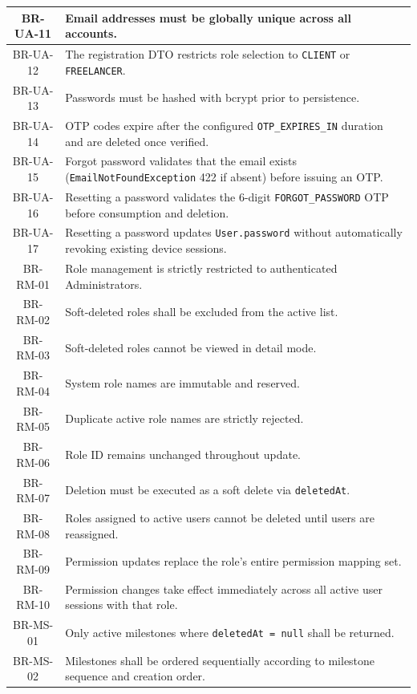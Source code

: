 \begin{longtable}{|c|p{12cm}|}
    BR-UA-11 & Email addresses must be globally unique across all accounts. \\ \hline
    BR-UA-12 & The registration DTO restricts role selection to \texttt{CLIENT} or \texttt{FREELANCER}. \\ \hline
    BR-UA-13 & Passwords must be hashed with bcrypt prior to persistence. \\ \hline
    BR-UA-14 & OTP codes expire after the configured \texttt{OTP\_EXPIRES\_IN} duration and are deleted once verified. \\ \hline
    BR-UA-15 & Forgot password validates that the email exists (\texttt{EmailNotFoundException} 422 if absent) before issuing an OTP. \\ \hline
    BR-UA-16 & Resetting a password validates the 6-digit \texttt{FORGOT\_PASSWORD} OTP before consumption and deletion. \\ \hline
    BR-UA-17 & Resetting a password updates \texttt{User.password} without automatically revoking existing device sessions. \\ \hline
    BR-RM-01 & Role management is strictly restricted to authenticated Administrators. \\ \hline
    BR-RM-02 & Soft-deleted roles shall be excluded from the active list. \\ \hline
    BR-RM-03 & Soft-deleted roles cannot be viewed in detail mode. \\ \hline
    BR-RM-04 & System role names are immutable and reserved. \\ \hline
    BR-RM-05 & Duplicate active role names are strictly rejected. \\ \hline
    BR-RM-06 & Role ID remains unchanged throughout update. \\ \hline
    BR-RM-07 & Deletion must be executed as a soft delete via \texttt{deletedAt}. \\ \hline
    BR-RM-08 & Roles assigned to active users cannot be deleted until users are reassigned. \\ \hline
    BR-RM-09 & Permission updates replace the role's entire permission mapping set. \\ \hline
    BR-RM-10 & Permission changes take effect immediately across all active user sessions with that role. \\ \hline
    BR-MS-01 & Only active milestones where \texttt{deletedAt = null} shall be returned. \\ \hline
    BR-MS-02 & Milestones shall be ordered sequentially according to milestone sequence and creation order. \\ \hline

\end{longtable}
